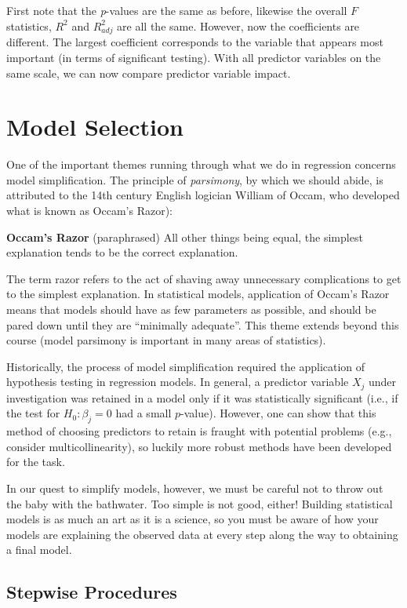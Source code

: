 \documentclass[
]{book}
\begin{document}
First note that the \emph{p}-values are the same as before, likewise the overall \(F\) statistics, \(R^2\) and \(R_{adj}^2\) are all the same. However, now the coefficients are different. The largest coefficient corresponds to the variable that appears most important (in terms of significant testing). With all predictor variables on the same scale, we can now compare predictor variable impact.

\hypertarget{model-selection}{%
\chapter{Model Selection}\label{model-selection}}

One of the important themes running through what we do in regression concerns model simplification. The principle of \emph{parsimony}, by which we should abide, is attributed to the 14th century English logician William of Occam, who developed what is known as Occam's Razor):

\textbf{Occam's Razor} (paraphrased)
All other things being equal, the simplest explanation tends to be the correct explanation.

The term razor refers to the act of shaving away unnecessary complications to get to the simplest explanation. In statistical models, application of Occam's Razor means that models should have as few parameters as possible, and should be pared down until they are ``minimally adequate''. This theme extends beyond this course (model parsimony is important in many areas of statistics).

Historically, the process of model simplification required the application of hypothesis testing in regression models. In general, a predictor variable \(X_j\) under investigation was retained in a model only if it was statistically significant (i.e., if the test for \(H_0: \beta_j = 0\) had a small \(p\)-value). However, one can show that this method of choosing predictors to retain is fraught with potential problems (e.g., consider multicollinearity), so luckily more robust methods have been developed for the task.

In our quest to simplify models, however, we must be careful not to throw out the baby with the bathwater. Too simple is not good, either! Building statistical models is as much an art as it is a science, so you must be aware of how your models are explaining the observed data at every step along the way to obtaining a final model.

\hypertarget{stepwise-procedures}{%
\section{Stepwise Procedures}\label{stepwise-procedures}}
\end{document}

